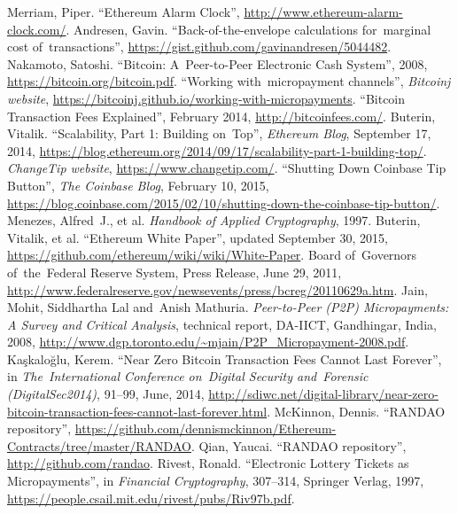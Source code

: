 \documentclass[a4paper]{article}
\begin{document}
\begin{thebibliography}{9}
 Merriam, Piper. ``Ethereum Alarm Clock'',
  \url{http://www.ethereum-alarm-clock.com/}.
 Andresen, Gavin. ``Back-of-the-envelope calculations for~marginal cost of~transactions'',
  \url{https://gist.github.com/gavinandresen/5044482}.
 Nakamoto, Satoshi. ``Bitcoin: A~Peer-to-Peer Electronic Cash System'', 2008,
  \url{https://bitcoin.org/bitcoin.pdf}.
 ``Working with~micropayment channels'', \textit{Bitcoinj website}, 
  \url{https://bitcoinj.github.io/working-with-micropayments}.
 ``Bitcoin Transaction Fees Explained'', February 2014,
  \url{http://bitcoinfees.com/}.
 Buterin, Vitalik. ``Scalability, Part 1: Building on~Top'', \textit{Ethereum Blog}, September 17, 2014,
  \url{https://blog.ethereum.org/2014/09/17/scalability-part-1-building-top/}.
 \textit{ChangeTip website}, \url{https://www.changetip.com/}.
 ``Shutting Down Coinbase Tip Button'', \textit{The Coinbase Blog}, February 10, 2015,
  \url{https://blog.coinbase.com/2015/02/10/shutting-down-the-coinbase-tip-button/}.
 Menezes, Alfred~J., et al. \textit{Handbook of Applied Cryptography}, 1997.
 Buterin, Vitalik, et al. ``Ethereum White Paper'', updated September 30, 2015,
  \url{https://github.com/ethereum/wiki/wiki/White-Paper}.
 Board of~Governors of~the~Federal Reserve System, Press Release, June 29, 2011,
  \url{http://www.federalreserve.gov/newsevents/press/bcreg/20110629a.htm}.
 Jain, Mohit, Siddhartha Lal and~Anish Mathuria. \textit{Peer-to-Peer (P2P) Micropayments: A Survey and Critical Analysis}, technical report, DA-IICT, Gandhingar, India, 2008,
  \url{http://www.dgp.toronto.edu/~mjain/P2P_Micropayment-2008.pdf}.
 Kaşkaloğlu, Kerem. ``Near Zero Bitcoin Transaction Fees Cannot Last Forever'',
  in \textit{The~International Conference on~Digital Security and~Forensic (DigitalSec2014)}, 91--99, June, 2014,
  \url{http://sdiwc.net/digital-library/near-zero-bitcoin-transaction-fees-cannot-last-forever.html}.
 McKinnon, Dennis. ``RANDAO repository'',
  \url{https://github.com/dennismckinnon/Ethereum-Contracts/tree/master/RANDAO}.
 Qian, Yaucai. ``RANDAO repository'',
  \url{http://github.com/randao}.
 Rivest, Ronald. ``Electronic Lottery Tickets as Micropayments'',
    in \textit{Financial Cryptography}, 307--314, Springer Verlag, 1997,
    \url{https://people.csail.mit.edu/rivest/pubs/Riv97b.pdf}.

\end{thebibliography}
\end{document}
